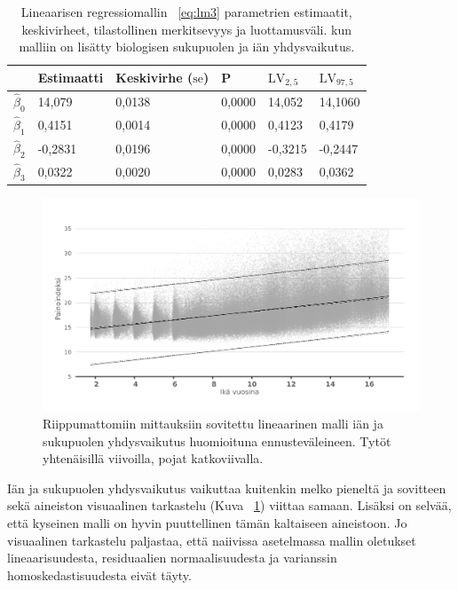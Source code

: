 \documentclass[finnish]{docopts}
\begin{document}
\begin{table}[H]
\centering
\begin{tabular}{llllll}
\toprule
  & Estimaatti & Keskivirhe ($\text{se}$) & P & $\text{LV}_{2,5}$ & $\text{LV}_{97,5}$\\
\midrule
$\hat{\beta}_0$ & 14,079 & 0,0138 & 0,0000 & 14,052 & 14,1060\\
$\hat{\beta}_1$ & 0,4151 & 0,0014 & 0,0000 & 0,4123 & 0,4179\\
$\hat{\beta}_2$ & -0,2831 & 0,0196 & 0,0000 & -0,3215 & -0,2447\\
$\hat{\beta}_3$ & 0,0322 & 0,0020 & 0,0000 & 0,0283 & 0,0362\\
\bottomrule
\end{tabular}
\caption{Lineaarisen regressiomallin ~\ref{eq:lm3} parametrien estimaatit, keskivirheet, tilastollinen merkitsevyys ja luottamusväli. kun malliin on lisätty biologisen sukupuolen ja iän yhdysvaikutus.}
\label{table:lm3}
\end{table}

\begin{figure}[H]
\centering
  \includegraphics[scale=0.8]{kuvaajat/lm_baseline.png}
  \caption{Riippumattomiin mittauksiin sovitettu lineaarinen malli iän ja sukupuolen yhdysvaikutus huomioituna ennusteväleineen. Tytöt yhtenäisillä viivoilla, pojat katkoviivalla.}
  \label{fig:lm_baseline}
\end{figure}

Iän ja sukupuolen yhdysvaikutus vaikuttaa kuitenkin melko pieneltä ja sovitteen sekä aineiston visuaalinen tarkastelu (Kuva ~\ref{fig:lm_baseline}) viittaa samaan. Lisäksi on selvää, että kyseinen malli on hyvin puuttellinen tämän kaltaiseen aineistoon. Jo visuaalinen tarkastelu paljastaa, että naiivissa asetelmassa mallin oletukset lineaarisuudesta, residuaalien normaalisuudesta ja varianssin homoskedastisuudesta eivät täyty.\\
\end{document}
